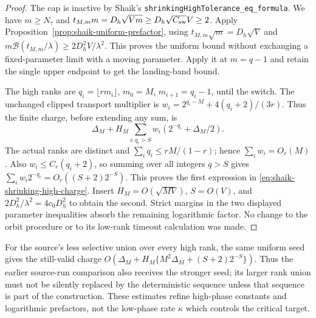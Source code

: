 \documentclass[11pt]{article}
\theoremstyle{remark}\newtheorem{remark}[proposition]{Remark}
\begin{document}
\begin{proof}
The cap is inactive by Shaik's
\texttt{shrinkingHighTolerance\_eq\_formula}.
We have \(m\ge N_\tau\) and
\(t_{M,m}m=D_h\sqrt{Vm}\ge D_h\sqrt{C_{\rm sw}}V\ge2\).
Apply Proposition~\ref{prop:shaik-uniform-prefactor}, using
\(t_{M,m}\sqrt m=D_h\sqrt V\) and
\(m\mathcal B(t_{M,m}/\lambda)\ge2D_h^2V/\lambda^2\).
This proves the uniform bound without exchanging a fixed-parameter
limit with a moving parameter. Apply it at \(m=q-1\) and retain the
single upper endpoint to get the landing-band bound.

The high ranks are \(q_i=\lfloor rm_i\rfloor\),
\(m_0=M\), \(m_{i+1}=q_i-1\), until the switch.
The unchanged clipped transport multiplier is
\(w_i=2^{q_i-M}+4(q_i+2)/(3r)\).
Thus the finite charge, before extending any sum, is
\[
 \Delta_M+
 H_M\sum_{i:q_i>S}w_i(2^{-q_i}+\Delta_M/2).
\]
The actual ranks are distinct and \(\sum_iq_i\le rM/(1-r)\);
hence \(\sum_iw_i=O_r(M)\).
Also \(w_i\le C_r(q_i+2)\), so summing over all integers \(q>S\)
gives \(\sum_iw_i2^{-q_i}=O_r((S+2)2^{-S})\).
This proves the first expression in
\eqref{eq:shaik-shrinking-high-charge}.
Insert \(H_M=O(\sqrt{MV})\), \(S=O(V)\), and
\(2D_h^2/\lambda^2=4c_0D_h^2\) to obtain the second.
Strict margins in the two displayed parameter inequalities absorb
the remaining logarithmic factor. No change to the orbit procedure
or to its low-rank timeout calculation was made.
\end{proof}

For the source's less selective union over every high rank, the same
uniform seed gives the still-valid charge
\(O(\Delta_M+H_M\{M^2\Delta_M+(S+2)2^{-S}\})\).
Thus the earlier source-run comparison also receives the stronger seed;
its larger rank union must not be silently replaced by the deterministic
sequence unless that sequence is part of the construction.
These estimates refine high-phase constants and logarithmic prefactors,
not the low-phase rate \(\kappa\) which controls the critical target.
\end{document}
